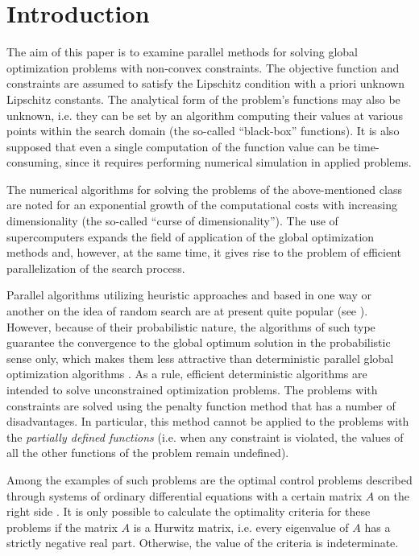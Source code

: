 \documentclass[smallextended]{svjour3}       %
\begin{document}
\section{Introduction}
\label{intro}

The aim of this paper is to examine parallel methods for solving global optimization problems with non-convex constraints. The objective function and constraints are assumed to satisfy the Lipschitz condition with a priori unknown Lipschitz constants. The analytical form of the problem's functions may also be unknown, i.e. they can be set by an algorithm computing their values at various points within the search domain (the so-called ``black-box'' functions). It is also supposed that even a single computation of the function value can be time-consuming, since it requires performing numerical simulation in applied problems. 

The numerical algorithms for solving the problems of the above-mentioned class are noted for an exponential growth of the computational costs with increasing dimensionality (the so-called ``curse of dimensionality''). The use of supercomputers expands the field of application of the global optimization methods and, however, at the same time, it gives rise to the problem of efficient parallelization of the search process.

Parallel algorithms utilizing heuristic approaches and based in one way or another on the idea of random search are at present quite popular (see \cite{RefFerreiro,RefZhu,Korosec,Guerrero}). However, because of their probabilistic nature, the algorithms of such type guarantee the convergence to the global optimum solution in the probabilistic sense only, which makes them less attractive than deterministic parallel global optimization algorithms \cite{Jones2001,Paulavicius2011,Evtushenko2013,Strongin2000}. As a rule, efficient deterministic algorithms are intended to solve unconstrained optimization problems. The problems with constraints are solved using the penalty function method that has a number of disadvantages. In particular, this method cannot be applied to the problems with the \textit{partially defined functions} (i.e. when any constraint is violated, the values of all the other functions of the problem remain undefined).

Among the examples of such problems are the optimal control problems described through systems of ordinary differential equations with a certain matrix $A$ on the right side \cite{Balandin2011,Balandin2017}. It is only possible to calculate the optimality criteria for these problems if the matrix $A$ is a Hurwitz matrix, i.e. every eigenvalue of $A$ has a strictly negative real part. Otherwise, the value of the criteria is indeterminate.
\end{document}
